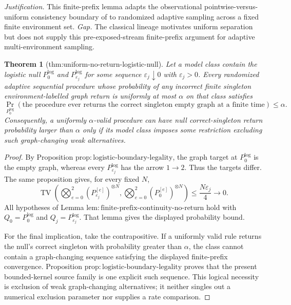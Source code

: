 \documentclass{article}
\newtheorem{theorem}{Theorem}
\begin{document}
\par\smallskip\noindent \textit{Justification.} This finite-prefix lemma adapts the observational pointwise-versus-uniform consistency boundary of \cite{robins2003uniform,zhang2003strong} to randomized adaptive sampling across a fixed finite environment set. \textit{Gap.} The classical lineage motivates uniform separation but does not supply this pre-exposed-stream finite-prefix argument for adaptive multi-environment sampling.

\begin{theorem}[thm:uniform-no-return-logistic-null]\label{thm:uniform-no-return-logistic-null}
Let a model class contain the logistic null \(P_0^{\mathrm{log}}\) and \(P_{\varepsilon_j}^{\mathrm{log}}\) for some sequence \(\varepsilon_j\downarrow0\) with \(\varepsilon_j>0\).  Every randomized adaptive sequential procedure whose probability of any incorrect finite singleton environment-labelled graph return is uniformly at most \(\alpha\) on that class satisfies
\[
 \Pr_{P_0^{\mathrm{log}}}\!\left(
   \text{the procedure ever returns the correct singleton empty graph at a finite time}
 \right)\le\alpha.
\]
Consequently, a uniformly \(\alpha\)-valid procedure can have null correct-singleton return probability larger than \(\alpha\) only if its model class imposes some restriction excluding such graph-changing weak alternatives.
\end{theorem}
\begin{proof}
By Proposition \(\mathrm{prop{:}logistic\mbox{-}boundary\mbox{-}legality}\), the graph target at \(P_0^{\mathrm{log}}\) is the empty graph, whereas every \(P_{\varepsilon_j}^{\mathrm{log}}\) has the arrow \(1\to2\).  Thus the targets differ.  The same proposition gives, for every fixed \(N\),
\[
 \operatorname{TV}\!\left(
   \bigotimes_{e=0}^2(P_{\varepsilon_j}^{[e]})^{\otimes N},
   \bigotimes_{e=0}^2(P_0^{[e]})^{\otimes N}
 \right)
 \le\frac{N\varepsilon_j}{4}\longrightarrow0.
\]
All hypotheses of Lemma \(\mathrm{lem{:}finite\mbox{-}prefix\mbox{-}continuity\mbox{-}no\mbox{-}return}\) hold with \(Q_0=P_0^{\mathrm{log}}\) and \(Q_j=P_{\varepsilon_j}^{\mathrm{log}}\).  That lemma gives the displayed probability bound.

For the final implication, take the contrapositive.  If a uniformly valid rule returns the null's correct singleton with probability greater than \(\alpha\), the class cannot contain a graph-changing sequence satisfying the displayed finite-prefix convergence.  Proposition \(\mathrm{prop{:}logistic\mbox{-}boundary\mbox{-}legality}\) proves that the present bounded-kernel source family is one explicit such sequence.  This logical necessity is exclusion of weak graph-changing alternatives; it neither singles out a numerical exclusion parameter nor supplies a rate comparison.
\end{proof}
\end{document}
